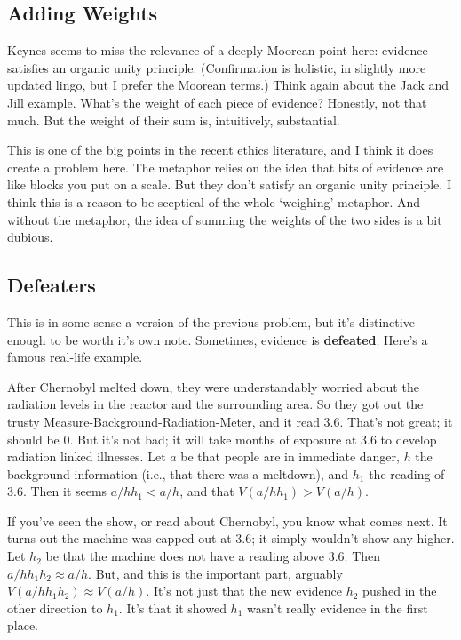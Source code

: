 \documentclass[
  11pt,
  letterpaper,
  DIV=11,
  numbers=noendperiod,
  oneside]{scrartcl}
\begin{document}
\subsection{Adding Weights}\label{adding-weights}

Keynes seems to miss the relevance of a deeply Moorean point here:
evidence satisfies an organic unity principle. (Confirmation is
holistic, in slightly more updated lingo, but I prefer the Moorean
terms.) Think again about the Jack and Jill example. What's the weight
of each piece of evidence? Honestly, not that much. But the weight of
their sum is, intuitively, substantial.

This is one of the big points in the recent ethics literature, and I
think it does create a problem here. The metaphor relies on the idea
that bits of evidence are like blocks you put on a scale. But they don't
satisfy an organic unity principle. I think this is a reason to be
sceptical of the whole `weighing' metaphor. And without the metaphor,
the idea of summing the weights of the two sides is a bit dubious.

\subsection{Defeaters}\label{defeaters}

This is in some sense a version of the previous problem, but it's
distinctive enough to be worth it's own note. Sometimes, evidence is
\textbf{defeated}. Here's a famous real-life example.

After Chernobyl melted down, they were understandably worried about the
radiation levels in the reactor and the surrounding area. So they got
out the trusty Measure-Background-Radiation-Meter, and it read 3.6.
That's not great; it should be 0. But it's not bad; it will take months
of exposure at 3.6 to develop radiation linked illnesses. Let \(a\) be
that people are in immediate danger, \(h\) the background information
(i.e., that there was a meltdown), and \(h_1\) the reading of 3.6. Then
it seems \(a/hh_1 < a/h\), and that \(V(a/hh_1) > V(a/h)\).

If you've seen the show, or read about Chernobyl, you know what comes
next. It turns out the machine was capped out at 3.6; it simply wouldn't
show any higher. Let
\(h_2\) be that the machine does not have a reading above 3.6. Then
\(a/hh_1h_2 \approx a/h\). But, and this is the important part, arguably
\(V(a/hh_1h_2) \approx V(a/h)\). It's not just that the new evidence
\(h_2\) pushed in the other direction to \(h_1\). It's that it showed
\(h_1\) wasn't really evidence in the first place.
\end{document}
